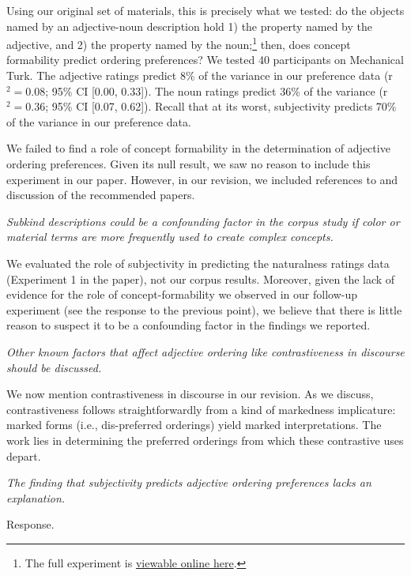 \documentclass[12pt]{article}
\begin{document}
Using our original set of materials, this is precisely what we tested: do the objects named by an adjective-noun description hold 1) the property named by the adjective, and 2) the property named by the noun;\footnote{The full experiment is \href{http://web.stanford.edu/~scontras/adjective_ordering/experiments/9-concept-formability/concept-formability.html}{viewable online here}.} then, does concept formability predict ordering preferences? We tested 40 participants on Mechanical Turk. The adjective ratings predict 8\% of the variance in our preference data (r$^{2}=0.08$; 95\% CI [0.00,  0.33]). The noun ratings predict 36\% of the variance (r$^{2}=0.36$; 95\% CI [0.07,  0.62]). Recall that at its worst, subjectivity predicts 70\% of the variance in our preference data.

We failed to find a role of concept formability in the determination of adjective ordering preferences. Given its null result, we saw no reason to include this experiment in our paper. However, in our revision, we included references to and discussion of the recommended papers.


\item  \emph{Subkind descriptions could be a confounding factor in the corpus study if color or material terms are more frequently used to create complex concepts.}

We evaluated the role of subjectivity in predicting the naturalness ratings data (Experiment 1 in the paper), not our corpus results. Moreover, given the lack of evidence for the role of concept-formability we observed in our follow-up experiment (see the response to the previous point), we believe that there is little reason to suspect it to be a confounding factor in the findings we reported.


\item \emph{Other known factors that affect adjective ordering like contrastiveness in discourse should be discussed.}

We now mention contrastiveness in discourse in our revision. As we discuss, contrastiveness follows straightforwardly from a kind of markedness implicature: marked forms (i.e., dis-preferred orderings) yield marked interpretations. The work lies in determining the preferred orderings from which these contrastive uses depart.


\item \emph{The finding that subjectivity predicts adjective ordering preferences lacks an explanation.}

Response.
\end{document}
